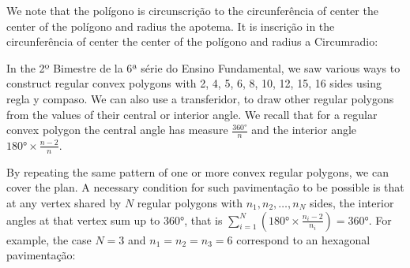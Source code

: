 \begin{center}
\end{center}

We note that the polígono is circunscrição to the circunferência
of center the center of the polígono and radius the apotema. It is inscrição in
the circunferência of center the center of the polígono and radius a
Circumradio:

\begin{center}
\end{center}

In the 2º Bimestre de la 6ª série do Ensino Fundamental, we saw various
ways to construct regular convex polygons with 2, 4, 5, 6, 8, 10, 12, 15, 16
sides using regla y compaso. We can also use a transferidor, to draw other
regular polygons from the values of their central or interior angle.
We recall that for a regular convex polygon the central angle has measure
$\frac{360°}{n}$ and the interior angle $180° \times \frac{n-2}{n}$.

By repeating the same pattern of one or more convex regular polygons, we can
cover the plan. A necessary condition for such pavimentação to be possible is
that at any vertex shared by $N$ regular polygons with $n_1, n_2, \dots, n_N$
sides, the interior angles at that vertex sum up to 360°, that is
$\sum_{i=1}^N (180° \times \frac{n_i-2}{n_i}) = 360°$.
For example, the case $N=3$ and $n_1=n_2=n_3=6$ correspond to an hexagonal
pavimentação:

